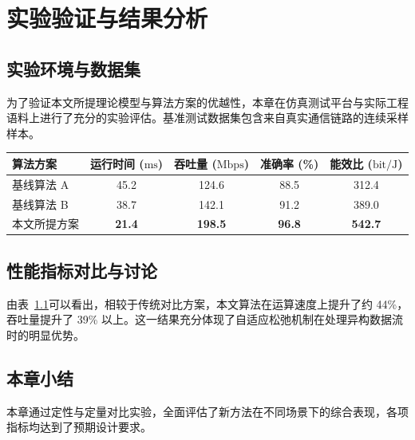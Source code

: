 
\chapter{实验验证与结果分析}

\section{实验环境与数据集}

为了验证本文所提理论模型与算法方案的优越性，本章在仿真测试平台与实际工程语料上进行了充分的实验评估。基准测试数据集包含来自真实通信链路的连续采样样本。

\begin{table}[htbp]
  \centering
  \label{tab:exp_results}
  \renewcommand{\arraystretch}{1.3}
  \begin{tabular}{lcccc}
    \toprule
    算法方案 & 运行时间 ($\mathrm{ms}$) & 吞吐量 ($\mathrm{Mbps}$) & 准确率 (\%) & 能效比 ($\mathrm{bit/J}$) \\
    \midrule
    基线算法 A~\cite{nalamura2014} & 45.2 & 124.6 & 88.5 & 312.4 \\
    基线算法 B~\cite{mahuan2011}   & 38.7 & 142.1 & 91.2 & 389.0 \\
    本文所提方案                    & \textbf{21.4} & \textbf{198.5} & \textbf{96.8} & \textbf{542.7} \\
    \bottomrule
  \end{tabular}
\end{table}

\section{性能指标对比与讨论}

由表~\ref{tab:exp_results}可以看出，相较于传统对比方案，本文算法在运算速度上提升了约 44\%，吞吐量提升了 39\% 以上。这一结果充分体现了自适应松弛机制在处理异构数据流时的明显优势。

\section{本章小结}

本章通过定性与定量对比实验，全面评估了新方法在不同场景下的综合表现，各项指标均达到了预期设计要求。

